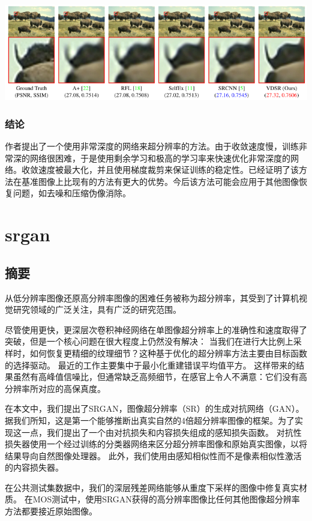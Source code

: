 \documentclass[UTF8,a4paper,10pt]{ctexrep}
\begin{document}
\includegraphics[width=\textwidth]{figure/7.png}

\subsection{结论}
作者提出了一个使用非常深度的网络来超分辨率的方法。由于收敛速度慢，训练非常深的网络很困难，于是使用剩余学习和极高的学习率来快速优化非常深度的网络。收敛速度被最大化，并且使用梯度裁剪来保证训练的稳定性。已经证明了该方法在基准图像上比现有的方法有更大的优势。今后该方法可能会应用于其他图像恢复问题，如去噪和压缩伪像消除。


\chapter{srgan}
\section{摘要}
从低分辨率图像还原高分辨率图像的困难任务被称为超分辨率，其受到了计算机视觉研究领域的广泛关注，具有广泛的研究范围。

尽管使用更快，更深层次卷积神经网络在单图像超分辨率上的准确性和速度取得了突破，但是一个核心问题在很大程度上仍然没有解决：
当我们在进行大比例上采样时，如何恢复更精细的纹理细节？这种基于优化的超分辨率方法主要由目标函数的选择驱动。
最近的工作主要集中于最小化重建错误平均值平方。
这样带来的结果虽然有高峰值信噪比，但通常缺乏高频细节，在感官上令人不满意：它们没有高分辨率所对应的高保真度。

在本文中，我们提出了SRGAN，图像超分辨率（SR）的生成对抗网络（GAN）。
据我们所知，这是第一个能够推断出真实自然的4倍超分辨率图像的框架。为了实现这一点，我们提出了一个由对抗损失和内容损失组成的感知损失函数。
对抗性损失器使用一个经过训练的分类器网络来区分超分辨率图像和原始真实图像，以将结果导向自然图像处理器。
此外，我们使用由感知相似性而不是像素相似性激活的内容损失器。

在公共测试集数据中，我们的深层残差网络能够从重度下采样的图像中修复真实材质。
在MOS测试中，使用SRGAN获得的高分辨率图像比任何其他图像超分辨率方法都要接近原始图像。
\end{document}
